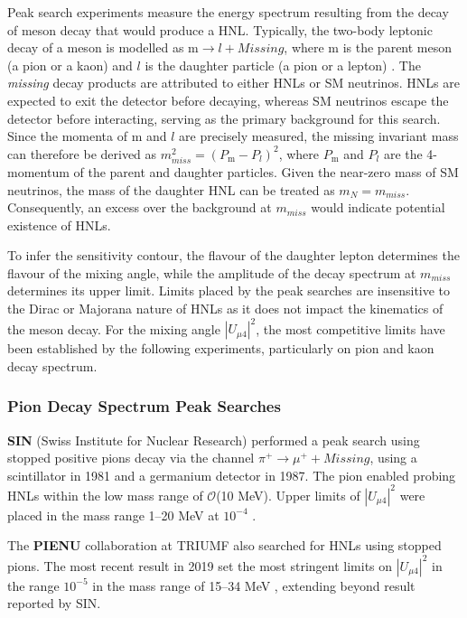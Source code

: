 Peak search experiments measure the energy spectrum  resulting from the decay of meson decay that would produce a HNL. 
Typically, the two-body leptonic decay of a meson is modelled as $\text{m}\rightarrow l + Missing$, where $\text{m}$ is the parent meson (a pion or a kaon) and $l$ is the daughter particle (a pion or a lepton) \cite{OwenPhD}.
The \textit{missing} decay products are attributed to either HNLs or SM neutrinos.
HNLs are expected to exit the detector before decaying, whereas SM neutrinos escape the detector before interacting, serving as the primary background for this search.
Since the momenta of m and $l$ are precisely measured, the missing invariant mass can therefore be derived as $m^{2}_{miss} = (P_{\text{m}} - P_{l})^{2}$, where $P_{\text{m}}$ and $P_{l}$ are the 4-momentum of the parent and daughter particles.
Given the near-zero mass of SM neutrinos, the mass of the daughter HNL can be treated as $m_{N} = m_{miss}$.
Consequently, an excess over the background at $m_{miss}$ would indicate potential existence of HNLs.

To infer the sensitivity contour, the flavour of the daughter lepton determines the flavour of the mixing angle, while the amplitude of the decay spectrum at $m_{miss}$ determines its upper limit.
Limits placed by the peak searches are insensitive to the Dirac or Majorana nature of HNLs as it does not impact the kinematics of the meson decay.
For the mixing angle $|U_{\mu4}|^{2}$, the most competitive limits have been established by the following experiments, particularly on pion and kaon decay spectrum.

\subsubsection{Pion Decay Spectrum Peak Searches}

\begin{coloritemize}
\item \textbf{SIN} (Swiss Institute for Nuclear Research) performed a peak search using stopped positive pions decay via the channel $\pi^{+} \rightarrow \mu^{+} + Missing$, using a scintillator in 1981 and a germanium detector in 1987.
The pion enabled probing HNLs within the low mass range of $\mathcal{O}$(10 MeV).
Upper limits of $|U_{\mu4}|^{2}$ were placed in the mass range 1--20 MeV at $10^{-4}$ \cite{SIN1, SIN2, SIN3}.

\item The \textbf{PIENU} collaboration at TRIUMF also searched for HNLs using stopped pions.
The most recent result in 2019 set the most stringent limits on $|U_{\mu4}|^{2}$ in the range $10^{-5}$ in the mass range of 15--34 MeV \cite{PIENU}, extending beyond result reported by SIN.

\end{coloritemize}

